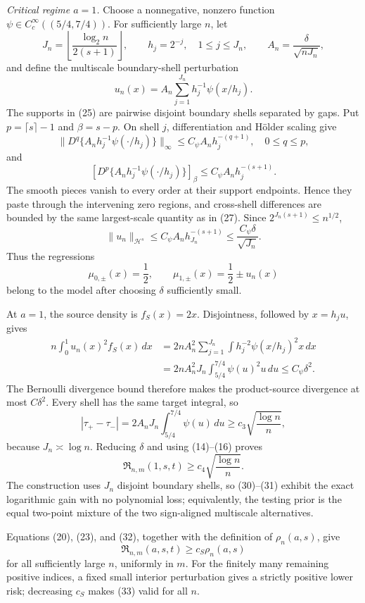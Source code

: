 \emph{Critical regime \(a=1\).}
Choose a nonnegative, nonzero function \(\psi\in C_c^\infty((5/4,7/4))\). For sufficiently large \(n\), let
\[
J_n=\left\lfloor\frac{\log_2 n}{2(s+1)}\right\rfloor,
\qquad
h_j=2^{-j},\quad 1\le j\le J_n,
\qquad
A_n=\frac{\delta}{\sqrt{nJ_n}},
\tag{24}
\]
and define the multiscale boundary-shell perturbation
\[
u_n(x)=A_n\sum_{j=1}^{J_n}h_j^{-1}\psi(x/h_j).
\tag{25}
\]
The supports in (25) are pairwise disjoint boundary shells separated by gaps. Put \(p=\lceil s\rceil-1\) and \(\beta=s-p\). On shell \(j\), differentiation and H\"older scaling give
\[
\lVert D^q\{A_nh_j^{-1}\psi(\cdot/h_j)\}\rVert_\infty
\le C_\psi A_nh_j^{-(q+1)},\quad 0\le q\le p,
\tag{26}
\]
and
\[
[D^p\{A_nh_j^{-1}\psi(\cdot/h_j)\}]_\beta
\le C_\psi A_nh_j^{-(s+1)}.
\tag{27}
\]
The smooth pieces vanish to every order at their support endpoints. Hence they paste through the intervening zero regions, and cross-shell differences are bounded by the same largest-scale quantity as in (27). Since \(2^{J_n(s+1)}\le n^{1/2}\),
\[
\lVert u_n\rVert_{\mathcal H^s}
\le C_\psi A_nh_{J_n}^{-(s+1)}
\le \frac{C_\psi\delta}{\sqrt{J_n}}.
\tag{28}
\]
Thus the regressions
\[
\mu_{0,\pm}(x)=\frac12,
\qquad
\mu_{1,\pm}(x)=\frac12\pm u_n(x)
\tag{29}
\]
belong to the model after choosing \(\delta\) sufficiently small.

At \(a=1\), the source density is \(f_S(x)=2x\). Disjointness, followed by \(x=h_ju\), gives
\[
\begin{aligned}
n\int_0^1u_n(x)^2f_S(x)\,dx
&=2nA_n^2\sum_{j=1}^{J_n}
\int h_j^{-2}\psi(x/h_j)^2x\,dx\\
&=2nA_n^2J_n\int_{5/4}^{7/4}\psi(u)^2u\,du
\le C_\psi\delta^2.
\end{aligned}
\tag{30}
\]
The Bernoulli divergence bound therefore makes the product-source divergence at most \(C\delta^2\). Every shell has the same target integral, so
\[
|\tau_+-\tau_-|
=2A_nJ_n\int_{5/4}^{7/4}\psi(u)\,du
\ge c_3\sqrt{\frac{\log n}{n}},
\tag{31}
\]
because \(J_n\asymp\log n\). Reducing \(\delta\) and using (14)--(16) proves
\[
\mathfrak R_{n,m}(1,s,t)
\ge c_4\sqrt{\frac{\log n}{n}}.
\tag{32}
\]
The construction uses \(J_n\) disjoint boundary shells, so (30)--(31) exhibit the exact logarithmic gain with no polynomial loss; equivalently, the testing prior is the equal two-point mixture of the two sign-aligned multiscale alternatives.

Equations (20), (23), and (32), together with the definition of \(\rho_n(a,s)\), give
\[
\mathfrak R_{n,m}(a,s,t)\ge c_S\rho_n(a,s)
\tag{33}
\]
for all sufficiently large \(n\), uniformly in \(m\). For the finitely many remaining positive indices, a fixed small interior perturbation gives a strictly positive lower risk; decreasing \(c_S\) makes (33) valid for all \(n\).

